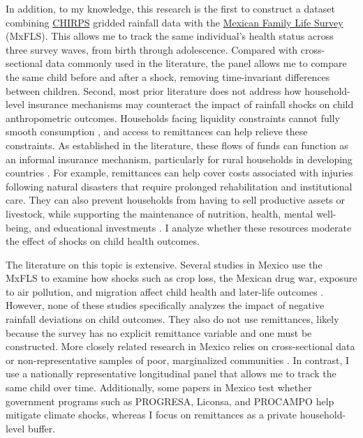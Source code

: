 In addition, to my knowledge, this research is the first to construct a dataset combining \href{https://www.chc.ucsb.edu/data/chirps}{CHIRPS} gridded rainfall data with the \href{https://ennvih-mxfls.org/english/index.html}{Mexican Family Life Survey} (MxFLS). This allows me to track the same individual's health status across three survey waves, from birth through adolescence. Compared with cross-sectional data commonly used in the literature, the panel allows me to compare the same child before and after a shock, removing time-invariant differences between children. Second, most prior literature does not address how household-level insurance mechanisms may counteract the impact of rainfall shocks on child anthropometric outcomes. Households facing liquidity constraints cannot fully smooth consumption \parencite{deatonSavingLiquidityConstraints1991}, and access to remittances can help relieve these constraints. As established in the literature, these flows of funds can function as an informal insurance mechanism, particularly for rural households in developing countries \parencite{yangMigrantRemittances2011}. For example, remittances can help cover costs associated with injuries following natural disasters that require prolonged rehabilitation and institutional care. They can also prevent households from having to sell productive assets or livestock, while supporting the maintenance of nutrition, health, mental well-being, and educational investments \parencite{cook10thAnniversaryReview2008}. I analyze whether these resources moderate the effect of shocks on child health outcomes.

The literature on this topic is extensive. Several studies in Mexico use the MxFLS to examine how shocks such as crop loss, the Mexican drug war, exposure to air pollution, and migration affect child health and later-life outcomes \parencite{michaelsenChildrenRiskEffect2012,brownMexicanDrugWar2018,molinaPollutionAbilityGenderSpecific2021,damonChildhoodObesityMexico2014}. However, none of these studies specifically analyzes the impact of negative rainfall deviations on child outcomes. They also do not use remittances, likely because the survey has no explicit remittance variable and one must be constructed. More closely related research in Mexico relies on cross-sectional data or non-representative samples of poor, marginalized communities \parencite{agueroLongTermEffectClimate2014,skoufiasClimateVariabilityChild2012,adhvaryuHelpingChildrenCatch2024,aguilarNinoChildrenMediumterm2022}. In contrast, I use a nationally representative longitudinal panel that allows me to track the same child over time. Additionally, some papers in Mexico test whether government programs such as PROGRESA, Liconsa, and PROCAMPO help mitigate climate shocks, whereas I focus on remittances as a private household-level buffer.

